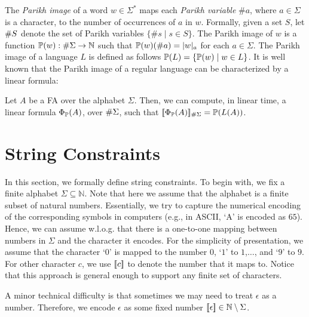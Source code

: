 \documentclass[sigplan,screen]{acmart}
\begin{document}
The \emph{Parikh image} of a word $w\in \Sigma^*$ maps each \emph{Parikh variable} $\#a$, where $a \in \Sigma$ is a character, to the number of occurrences of $a$ in $w$.
Formally, given a set $S$, let $\#{S}$ denote the set of Parikh variables $\{\#s \mid s\in S\}$. 
The Parikh image of $w$ is a function $\mathbb{P}{(w)}:\#{\Sigma} \rightarrow \mathbb{N}$ such that $\mathbb{P}{(w)} (\#a) = |w|_a$ for each $a\in\Sigma$.
The Parikh image of a language $L$ is defined as follows $\mathbb{P}{(L)} = \{\mathbb{P}{(w)} \mid w \in L\}$. %
%
It is well known that the Parikh image of a regular language  can be  characterized by a linear formula:



\begin{lemma}
Let $A$ be a FA over the alphabet $\Sigma$. Then, we can compute, in linear time,  a linear formula $\Phi_{\mathbb{P}}(A)$, over $\#{\Sigma}$, such that $[\![\Phi_{\mathbb{P}}(A)]\!]_{\#\Sigma} = \mathbb{P}{(L(A))}$.
\end{lemma}



 


\section{String Constraints} \label{section:sc}


In this section, we formally define string constraints. To begin with, we fix a finite alphabet $\Sigma \subseteq \mathbb{N}$. Note that here we assume that the alphabet is a finite subset of natural numbers. Essentially, we try to capture the numerical encoding of the corresponding symbols in computers (e.g., in ASCII, `A' is encoded as $65$). Hence, we can  assume w.l.o.g. that  there is a one-to-one mapping between numbers in $\Sigma$ and the character it encodes. For the simplicity of presentation, we assume that the character `$0$' is mapped to the number $0$, `$1$' to $1$,$\ldots$, and `$9$' to $9$. For other character $c$, we use $[\![c]\!]$ to denote the number that it maps to. Notice that this approach is general enough to support any finite set of characters. 


A minor technical difficulty is that sometimes  we may need to treat  $\epsilon$ as a  number. Therefore, we encode $\epsilon$ as some fixed number $[\![\epsilon]\!]\in\mathbb{N}\setminus\Sigma$.
\end{document}
